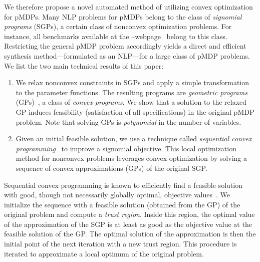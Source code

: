 We therefore propose a novel automated method of utilizing convex optimization for pMDPs.
%
Many NLP problems for pMDPs belong to the class of \emph{signomial programs} (SGPs), a certain class of nonconvex optimization problems.
For instance, all benchmarks available at the --webpage~\cite{param_website} belong to this class.
%
%
Restricting the general pMDP problem accordingly yields a direct and efficient synthesis method---formulated as an NLP---for a large class of pMDP problems. 
%
 We list the two main technical results of this paper:
\begin{enumerate}
	\item We relax nonconvex constraints in SGPs and apply a simple transformation to the parameter functions. The resulting programs are \emph{geometric programs} (GPs)~\cite{boyd2007tutorial}, a class of \emph{convex programs}. We show that a solution to the relaxed GP induces feasibility (satisfaction of all specifications) in the original pMDP problem. Note that solving GPs is \emph{polynomial} in the number of variables. 
	\smallskip
	\item Given an initial feasible solution, we use a technique called \emph{sequential convex programming}~\cite{boyd2007tutorial} to improve a signomial objective. This local optimization method for nonconvex problems leverages convex optimization by solving a sequence of convex approximations (GPs) of the original SGP. \end{enumerate}
%
Sequential convex programming is known to efficiently find a feasible solution with
good, though not necessarily globally optimal, objective values~\cite{boyd2007tutorial,boyd2008sequential}.
We initialize the sequence with a feasible solution (obtained from the GP) of the original problem and compute a \emph{trust region}. Inside this region, the optimal value of the approximation of the SGP is at least as good as the objective value at the feasible solution of the GP. 
The optimal solution of the approximation is then the initial point of the next iteration with a new trust region.
This procedure is iterated to approximate a local optimum of the original problem. 
%

